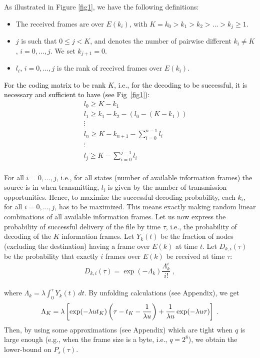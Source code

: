 \documentclass[10pt,twocolumn,conference,final]{IEEEtran}
\begin{document}
As illustrated in Figure \ref{fig1}, we have the following definitions:
\begin{itemize}
\item The received frames are over $E(k_i)$, with $K=k_0>k_1>k_2>\dots>k_j\geq 1$.
\item $j$ is such that $0\leq j< K$, and denotes the number of pairwise different $k_i\neq K$, $i=0,\dots,j$. We set $k_{j+1}=0$.
\item $l_{i}$, $i=0,\dots,j$ is the rank of received frames over $E(k_{i})$.
\end{itemize}
\textcolor{black}{For the coding matrix to be rank $K$, i.e., for the decoding to be successful, it is necessary and sufficient to have (see Fig~\ref{fig1}):}
\begin{eqnarray}
&&l_0\geq K-k_1\nonumber\\[-1mm]
&&l_1\geq k_1-k_2-(l_0-(K-k_1))\nonumber\\[-4mm]
&&\vdots\nonumber\\[-4mm]
&&l_n\geq K-k_{n+1}-\sum_{i=0}^{n-1} l_i\nonumber\\[-4mm]
&&\vdots\nonumber\\[-4mm]
&&l_{j}\geq K-\sum_{i=0}^{j-1} l_i\nonumber
\end{eqnarray}\\[-4mm]
For all $i=0,\dots,j$, i.e., for all states (number of available information frames) the source is in when transmitting, $l_i$ is given by the number of transmission opportunities. Hence, to maximize the successful decoding probability, each $k_i$, for all $i=0,\dots,j$, has to be maximized. This means exactly making random linear combinations of all available information frames.
Let us now express the probability of successful delivery of the file by time $\tau$, i.e., the probability of decoding of the $K$ information frames. Let $Y_{k}(t)$ be the fraction of nodes (excluding the destination) having a frame over $E(k)$ at time $t$. Let $D_{k,i}(\tau)$ be the probability that exactly $i$ frames over $E(k)$ be received at time $\tau$:\\[-4mm]
\[
D_{k,i}(\tau)=\exp(-\Lambda_k)\frac{\Lambda_k^i}{i!}\;,
\]\\[-4mm]
where $\Lambda_k=\lambda\int_0^{\tau}Y_{k}(t)\,dt$. 
By unfolding calculations (see Appendix), we get \\[-2mm]
\[\Lambda_K=\lambda\left[\exp(-\lambda u t_K)\left(\tau-t_K-\frac{1}{\lambda u}\right)+\frac{1}{\lambda u}\exp(-\lambda u \tau)\right]\;.\\[-2mm]\]
Then, by using some approximations (see Appendix) which are tight when $q$ is large enough (e.g., when the frame size is a byte, i.e., $q=2^8$), we obtain the lower-bound on $P_s(\tau)$.
\end{document}

